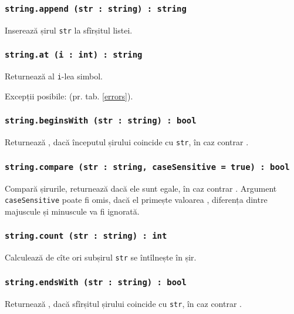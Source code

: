 \subsubsection{\texttt{string.append (str : string) : string}}

Inserează șirul \texttt{str} la sfîrșitul listei.

\subsubsection{\texttt{string.at (i : int) : string}}

Returnează al \texttt{i}-lea simbol.

Excepții posibile:  (pr. tab. \ref{errors}).

\subsubsection{\texttt{string.beginsWith (str : string) : bool}}

Returnează \true{}, dacă începutul șirului coincide cu \texttt{str}, în caz contrar \false{}.

\subsubsection{\texttt{string.compare (str : string, caseSensitive = true) : bool}}

Compară șirurile, returnează \true{} dacă ele sunt egale, în caz contrar \false{}. Argument \texttt{caseSensitive} poate fi omis, dacă el primește valoarea \false{}, diferența dintre majuscule și minuscule va fi ignorată.

\subsubsection{\texttt{string.count (str : string) : int}}

Calculează de cîte ori subșirul \texttt{str} se întîlnește în șir.

\subsubsection{\texttt{string.endsWith (str : string) : bool}}

Returnează \true{}, dacă sfîrșitul șirului coincide cu \texttt{str}, în caz contrar \false{}.


